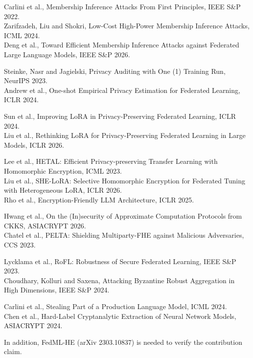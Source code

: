 \documentclass[10pt,a4paper]{article}
\begin{document}
\begin{description}[style=nextline,leftmargin=1.4em,font=\normalfont\itshape]
\item[Membership inference]
Carlini et al., Membership Inference Attacks From First Principles, IEEE S\&P 2022.\\
Zarifzadeh, Liu and Shokri, Low-Cost High-Power Membership Inference Attacks, ICML 2024.\\
Deng et al., Toward Efficient Membership Inference Attacks against Federated Large Language Models, IEEE S\&P 2026.
\item[Measuring leakage]
Steinke, Nasr and Jagielski, Privacy Auditing with One (1) Training Run, NeurIPS 2023.\\
Andrew et al., One-shot Empirical Privacy Estimation for Federated Learning, ICLR 2024.
\item[Federated fine-tuning of large models]
Sun et al., Improving LoRA in Privacy-Preserving Federated Learning, ICLR 2024.\\
Liu et al., Rethinking LoRA for Privacy-Preserving Federated Learning in Large Models, ICLR 2026.
\item[Homomorphic encryption with transformers]
Lee et al., HETAL: Efficient Privacy-preserving Transfer Learning with Homomorphic Encryption, ICML 2023.\\
Liu et al., SHE-LoRA: Selective Homomorphic Encryption for Federated Tuning with Heterogeneous LoRA, ICLR 2026.\\
Rho et al., Encryption-Friendly LLM Architecture, ICLR 2025.
\item[Security of the encryption layer]
Hwang et al., On the (In)security of Approximate Computation Protocols from CKKS, ASIACRYPT 2026.\\
Chatel et al., PELTA: Shielding Multiparty-FHE against Malicious Adversaries, CCS 2023.
\item[Deviating clients]
Lycklama et al., RoFL: Robustness of Secure Federated Learning, IEEE S\&P 2023.\\
Choudhary, Kolluri and Saxena, Attacking Byzantine Robust Aggregation in High Dimensions, IEEE S\&P 2024.
\item[Extraction through labels]
Carlini et al., Stealing Part of a Production Language Model, ICML 2024.\\
Chen et al., Hard-Label Cryptanalytic Extraction of Neural Network Models, ASIACRYPT 2024.
\end{description}

In addition, FedML-HE (arXiv 2303.10837) is needed to verify the contribution claim.
\end{document}
